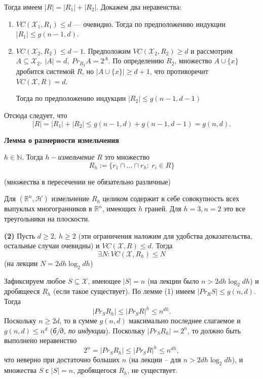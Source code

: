 Тогда имеем $|R| = |R_1| + |R_2|$. Докажем два неравенства:
\begin{enumerate}
    \item $VC(\mathcal{X}_1, R_1) \le d$ --- очевидно. Тогда по предположению индукции $|R_1| \le g(n-1, d)$.
    \item $VC(\mathcal{X}_2, R_2) \le d-1$.
    \Proof
    Предположим $VC(\mathcal{X}_2, R_2) \ge d$ и рассмотрим $A \subseteq \mathcal{X}_2,\: |A| = d,\: Pr_{R_2} A = 2^A$. По определению $R_2$, множество $A \cup \{x\}$ дробится системой $R$, но $|A \cup \{ x \}| \ge d+1$, что противоречит $VC(\mathcal{X}, R) = d$.
    \EndProof
    
    Тогда по предположению индукции $|R_2| \le g(n-1, d-1)$
\end{enumerate}

Отсюда следует, что $$|R| = |R_1| + |R_2| \le g(n-1, d) +  g(n-1, d-1) = g(n, d).$$

\EndProof

\textbf{Лемма о размерности измельчения}


\Def $h \in \mathbb{N}$. Тогда $h-$\textit{измельчение} $R$ это множество $$R_h := \{r_1 \cap \ldots \cap r_h:\: r_i \in R\}$$ 

(множества в пересечении не обязательно различные)

\Example Для $(\mathbb{R}^n, \mathcal{H})$ измельчение $R_h$ целиком содержит в себе совокупность всех выпуклых многогранников в $\mathbb{R}^n$, имеющих $h$ граней. Для $h = 3, n = 2$ это все треугольники на плоскости.

\Lemma \textbf{(2)} Пусть $d \ge 2,\: h \ge 2$ (эти ограничения наложим для удобства доказательства, остальные случаи очевидны) и $VC(\mathcal{X}, R) \le d$. Тогда $$ \exists N: VC(\mathcal{X}, R_h) \le N $$ (на лекции $N =  2dh \log_2 dh$) 

\Proof Зафиксируем любое $S \subseteq \mathcal{X}$, имеющее $|S| = n$ (на лекции было $n > 2dh \log_2 dh$) и дробящееся $R_h$ (если такое существует). По лемме (1) имеем $|Pr_R S| \le g(n, d)$. Тогда $$\left| Pr_S R_h\right| \le | Pr_S R|^h \le n^{dh}.$$
Поскольку $n \ge 2d$, то в сумме $g(n, d)$ максимально последнее слагаемое и $g(n, d) \le n^d$ ({\it б/д, по индукции}).
Поскольку  $|Pr_S R_h | = 2^n$, то должно быть выполнено неравенство $$2^n = | Pr_S R_h| \le | Pr_S R|^h \le n^{dh},$$
что неверно при достаточно больших $n$ (на лекции -- для $n > 2dh \log_2 dh$), и множества $S$ с $|S| = n$, дробящегося $R_h$, не существует.

\EndProof

